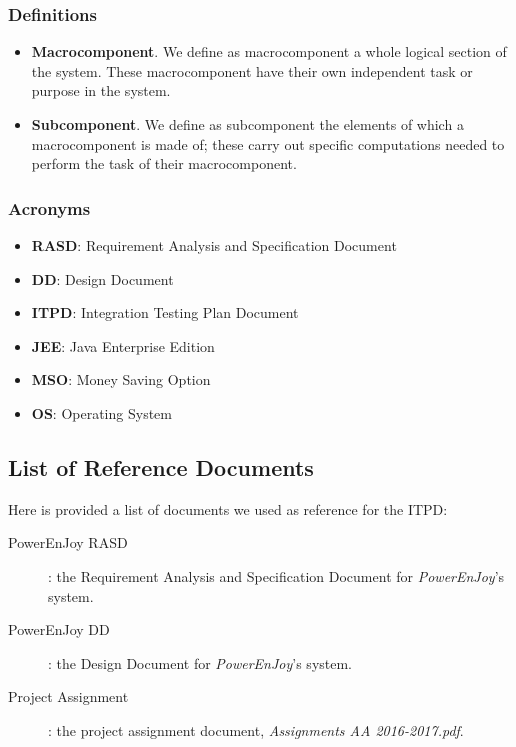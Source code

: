 	\subsubsection{Definitions}
		\begin{itemize}
			\item \textbf{Macrocomponent}. We define as macrocomponent a whole logical section of the system. These macrocomponent have their own independent task or purpose in the system. %
			\item \textbf{Subcomponent}. We define as subcomponent the elements of which a macrocomponent is made of; these carry out specific computations needed to perform the task of their macrocomponent.
		\end{itemize}
	\subsubsection{Acronyms}
		\begin{itemize}
			\item \textbf{RASD}: Requirement Analysis and Specification Document
			\item \textbf{DD}: Design Document
			\item \textbf{ITPD}: Integration Testing Plan Document
			\item \textbf{JEE}: Java Enterprise Edition
			\item \textbf{MSO}: Money Saving Option
			\item \textbf{OS}: Operating System
		\end{itemize}			
	
	

\subsection{List of Reference Documents}
	Here is provided a list of documents we used as reference for the ITPD:
	
	\begin{description}
		\item[PowerEnJoy RASD]: the Requirement Analysis and Specification Document for \textit{PowerEnJoy}'s system.
		\item[PowerEnJoy DD]: the Design Document for \textit{PowerEnJoy}'s system.
		\item[Project Assignment]: the project assignment document, \textit{Assignments AA 2016-2017.pdf}.
	\end{description}

